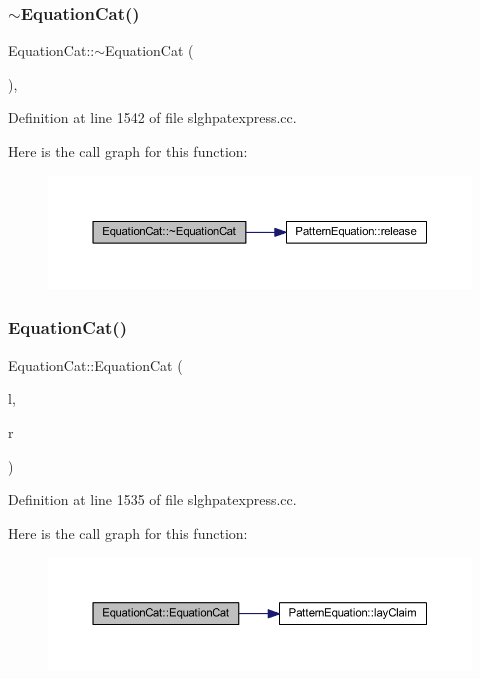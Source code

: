 \subsubsection{\texorpdfstring{$\sim$EquationCat()}{~EquationCat()}}
{\footnotesize\ttfamily Equation\+Cat\+::$\sim$\+Equation\+Cat (\begin{DoxyParamCaption}\item[{void}]{ }\end{DoxyParamCaption})\hspace{0.3cm}{\ttfamily [protected]}, {\ttfamily [virtual]}}



Definition at line 1542 of file slghpatexpress.\+cc.

Here is the call graph for this function\+:
\nopagebreak
\begin{figure}[H]
\begin{center}
\leavevmode
\includegraphics[width=350pt]{class_equation_cat_a0141c016c1d90e2a56135ae21c07fabb_cgraph}
\end{center}
\end{figure}
\mbox{\label{class_equation_cat_a1c0608fc808e9344ef7b498e0175e7e8}} 
\subsubsection{\texorpdfstring{EquationCat()}{EquationCat()}}
{\footnotesize\ttfamily Equation\+Cat\+::\+Equation\+Cat (\begin{DoxyParamCaption}\item[{\mbox{\hyperlink{class_pattern_equation}{Pattern\+Equation}} $\ast$}]{l,  }\item[{\mbox{\hyperlink{class_pattern_equation}{Pattern\+Equation}} $\ast$}]{r }\end{DoxyParamCaption})}



Definition at line 1535 of file slghpatexpress.\+cc.

Here is the call graph for this function\+:
\nopagebreak
\begin{figure}[H]
\begin{center}
\leavevmode
\includegraphics[width=350pt]{class_equation_cat_a1c0608fc808e9344ef7b498e0175e7e8_cgraph}
\end{center}
\end{figure}


